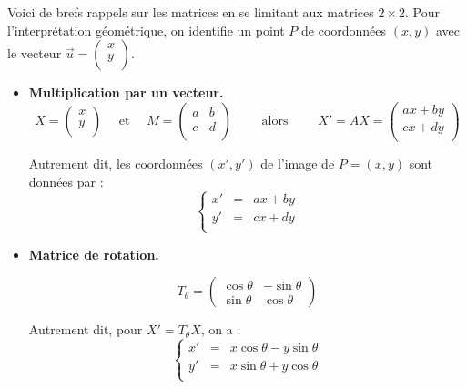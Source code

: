 \documentclass[11pt,class=report,crop=false]{standalone}
\begin{document}
\begin{cours}
Voici de brefs rappels sur les matrices en se limitant aux matrices $2\times 2$. Pour l'interprétation géométrique, on identifie un point $P$ de coordonnées $(x,y)$ avec le vecteur $\vec u = \left(\begin{smallmatrix}x\\y\\\end{smallmatrix}\right)$.

\begin{itemize}
	\item \textbf{Multiplication par un vecteur.}
	$$X = \begin{pmatrix}x\\y\\	\end{pmatrix}\quad \text{ et } \quad
	M = \begin{pmatrix}	a & b \\	c & d \\\end{pmatrix}
	\qquad \text{ alors } \qquad
	X' = A X = \begin{pmatrix}ax+by\\cx+dy\\\end{pmatrix}$$
	
	Autrement dit, les coordonnées $(x',y')$ de l'image de $P=(x,y)$ sont données par :
	$$\left\{\begin{array}{rcl}
	x' &=& ax+by\\
	y' &=& cx+dy\\
	\end{array}
	\right.$$	



\medskip



		
	\item \textbf{Matrice de rotation.}
	
	$$T_\theta = \begin{pmatrix}\cos \theta& -\sin \theta\\\sin\theta&\cos\theta\end{pmatrix}$$
	
	Autrement dit, pour $X'=T_\theta X$, on a : 
	$$\left\{\begin{array}{rcl}
	x' &=& x\cos \theta -y\sin \theta\\
	y' &=& x\sin\theta + y\cos\theta \\
	\end{array} \right.$$


\end{itemize}
\end{cours}
\end{document}
